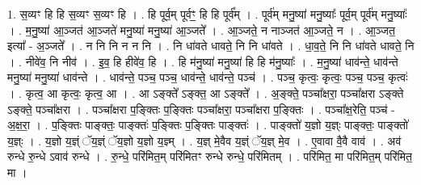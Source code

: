 \documentclass[17pt]{extarticle}
\begin{document}
1. स॒व्यꣳ हि हि स॒व्यꣳ स॒व्यꣳ हि । . हि पूर्व॒म् पूर्वꣳ॒॒ हि हि पूर्व᳚म् । . पूर्व॑म् मनु॒ष्या॑ मनु॒ष्याः᳚ पूर्व॒म् पूर्व॑म् मनु॒ष्याः᳚ । . म॒नु॒ष्या॑ आ॒ञ्जत॑ आ॒ञ्जते॑ मनु॒ष्या॑ मनु॒ष्या॑ आ॒ञ्जते᳚ । . आ॒ञ्जते॒ न नाञ्जत॑ आ॒ञ्जते॒ न । . आ॒ञ्जत॒ इत्या᳚ - अ॒ञ्जते᳚ । . न नि नि न न नि । . नि धा॑वते धावते॒ नि नि धा॑वते । . धा॒व॒ते॒ नि नि धा॑वते धावते॒ नि । . नीवे॑व॒ नि नीव॑ । . इ॒व॒ हि हीवे॑व॒ हि । . हि म॑नु॒ष्या॑ मनु॒ष्या॑ हि हि म॑नु॒ष्याः᳚ । . म॒नु॒ष्या॑ धाव॑न्ते॒ धाव॑न्ते मनु॒ष्या॑ मनु॒ष्या॑ धाव॑न्ते । . धाव॑न्ते॒ पञ्च॒ पञ्च॒ धाव॑न्ते॒ धाव॑न्ते॒ पञ्च॑ । . पञ्च॒ कृत्वः॒ कृत्वः॒ पञ्च॒ पञ्च॒ कृत्वः॑ । . कृत्व॒ आ कृत्वः॒ कृत्व॒ आ । . आ ऽङ्क्ते᳚ ऽङ्क्त॒ आ ऽङ्क्ते᳚ । . अ॒ङ्क्ते॒ पञ्चा᳚क्षरा॒ पञ्चा᳚क्षरा ऽङ्क्ते ऽङ्क्ते॒ पञ्चा᳚क्षरा । . पञ्चा᳚क्षरा प॒ङ्क्तिः प॒ङ्क्तिः पञ्चा᳚क्षरा॒ पञ्चा᳚क्षरा प॒ङ्क्तिः । . पञ्चा᳚क्ष॒रेति॒ पञ्च॑ - अ॒क्ष॒रा॒ । . प॒ङ्क्तिः पाङ्क्तः॒ पाङ्क्तः॑ प॒ङ्क्तिः प॒ङ्क्तिः पाङ्क्तः॑ । . पाङ्क्तो॑ य॒ज्ञो य॒ज्ञ्ः पाङ्क्तः॒ पाङ्क्तो॑ य॒ज्ञ्ः । . य॒ज्ञो य॒ज्ञ्ं ॅय॒ज्ञ्ं ॅय॒ज्ञो य॒ज्ञो य॒ज्ञ्म् । . य॒ज्ञ् मे॒वैव य॒ज्ञ्ं ॅय॒ज्ञ् मे॒व । . ए॒वावा वै॒वै वाव॑ । . अव॑ रुन्धे रु॒न्धे ऽवाव॑ रुन्धे । . रु॒न्धे॒ परि॑मित॒म् परि॑मितꣳ रुन्धे रुन्धे॒ परि॑मितम् । . परि॑मित॒ मा परि॑मित॒म् परि॑मित॒ मा । \newline
\end{document}
